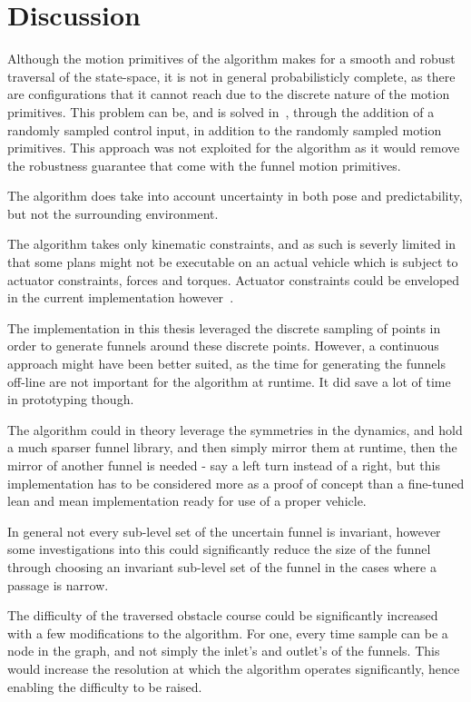 \chapter{Discussion}

Although the motion primitives of the \rrtfunnel{} algorithm makes for a smooth
and robust traversal of the state-space, it is not in general probabilisticly
complete, as there are configurations that it cannot reach due to the discrete
nature of the motion primitives. This problem can be, and is solved
in~\cite{vonasekGlobalMotionPlanning2013}, through the addition of a randomly
sampled control input, in addition to the randomly sampled motion primitives.
This approach was not exploited for the \rrtfunnel{} algorithm as it would
remove the robustness guarantee that come with the funnel motion primitives.

The algorithm does take into account uncertainty in both pose and
predictability, but not the surrounding environment.

The algorithm takes only kinematic constraints, and as such is severly limited
in that some plans might not be executable on an actual vehicle which is subject
to actuator constraints, forces and torques. Actuator constraints could be
enveloped in the current implementation
however~\cite{majumdarFunnelLibrariesRealtime2017}.

The implementation in this thesis leveraged the discrete sampling of points in
order to generate funnels around these discrete points. However, a continuous
approach might have been better suited, as the time for generating the funnels
off-line are not important for the algorithm at runtime. It did save a lot of
time in prototyping though.

The algorithm could in theory leverage the symmetries in the dynamics, and hold
a much sparser funnel library, and then simply mirror them at runtime, then the
mirror of another funnel is needed - say a left turn instead of a right, but
this implementation has to be considered more as a proof of concept than a
fine-tuned lean and mean implementation ready for use of a proper vehicle.

In general not every sub-level set of the uncertain funnel is invariant, however
some investigations into this could significantly reduce the size of the funnel
through choosing an invariant sub-level set of the funnel in the cases where a
passage is narrow.

The difficulty of the traversed obstacle course could be significantly increased
with a few modifications to the \rrtfunnel{} algorithm. For one, every time
sample can be a node in the graph, and not simply the inlet's and outlet's of
the funnels. This would increase the resolution at which the algorithm operates
significantly, hence enabling the difficulty to be raised.

